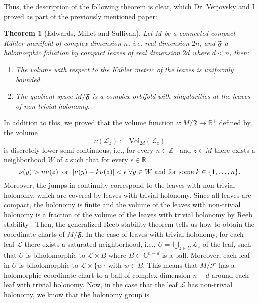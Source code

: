 \documentclass{article}
\newtheorem{theorem}{Theorem}
\newcommand{\zah}{\ensuremath{ \mathbb Z }}
\newcommand{\co}{\ensuremath{\mathbb C }}
\newcommand{\re}{\ensuremath{\mathbb R }}
\begin{document}
\noindent Thus, the description of the following theorem is clear, which Dr. Verjovsky and I proved as part of the previously mentioned paper:
\begin{theorem}[Edwards, Millet and Sullivan]\label{EMS}
        Let $M$ be a connected compact K\"ahler manifold of complex dimension $n$, i.e. real dimension $2n$, and $\mathfrak{F}$ a holomorphic foliation by compact
        leaves of real dimension $2d$ where $d<n$, then:
        \begin{enumerate}
                \item[a)] The volume with respect to the K\"ahler metric of the leaves is uniformly bounded.
                \item[b)] The quotient space $M/\mathfrak{F}$ is a complex orbifold with singularities at the leaves of non-trivial holonomy.
        \end{enumerate}
\end{theorem}
In addition to this, we proved that the volume function $\nu:M/\mathfrak{F}\rightarrow\re^{+}$ defined by the volume
\[
        \nu(\mathcal{L}_z):=\textrm{Vol}_{2d}(\mathcal{L}_z)
\]
is discretely lower semi-continuous, i.e., for every $n\in\zah^{+}$ and $z\in M$ there exists a neighborhood $W$ of $z$
such that for every $\epsilon\in\re^{+}$
\[
        \nu(y)>n\nu(z)\hspace{0.2cm}\text{or}\hspace{0.2cm}|\nu(y)-k\nu(z)|<\epsilon\hspace{0.1cm}\forall y\in W\text{ and for some}\hspace{0.1cm}k\in\{1,\dots,n\}.
\]
\noindent Moreover, the jumps in continuity correspond to the leaves with non-trivial holonomy, which are covered
by leaves with trivial holonomy. Since all leaves are compact, the holonomy is finite and the volume of the leaves
with non-trivial holonomy is a fraction of the volume of the leaves with trivial holonomy by Reeb stability \cite{Thurston}.
Then, the generalized Reeb stability theorem \cite{Thurston} tells us how to obtain the coordinate charts of $M/\mathfrak{F}$.
In the case of leaves with trivial holonomy, for each leaf $\mathcal{L}$ there exists a saturated neighborhood, i.e., $U=\bigcup_{z\in U}\mathcal{L}_z$ of the leaf,
such that $U$ is biholomorphic to $\mathcal{L}\times B$ where $B\subset\co^{n-d}$ is a ball. Moreover, each leaf in $U$ is biholomorphic to $\mathcal{L}\times\{w\}$ with $w\in B$.
This means that $M/\mathcal{F}$ has a holomorphic coordinate chart to a ball of complex dimension $n-d$ around each leaf
with trivial holonomy. Now, in the case that the leaf $\mathcal{L}$ has non-trivial holonomy, we know that the holonomy group is
\end{document}
